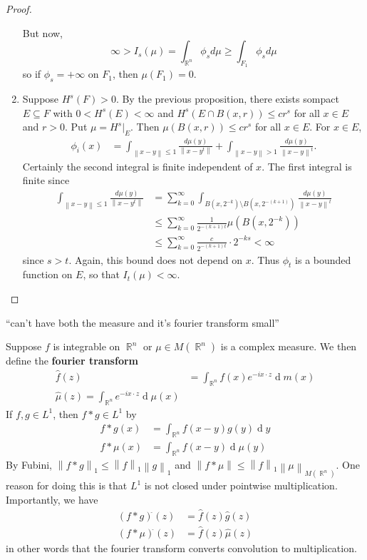 \documentclass[11pt, a4paper]{memoir}
\DeclareMathOperator{\R}{{\mathbb{R}}}
\newcommand{\norm}[1]{\ensuremath{\left\lVert#1\right\rVert}}
\theoremstyle{change}
\theoremstyle{plain}
\theoremstyle{nonumberplain}
\newtheorem{proof}{Proof}
\renewcommand{\d}[1]{\ensuremath{\operatorname{d}\!{#1}}}
\newcommand{\defn}[1]{{\boldmath\bfseries #1}}
\numberwithin{equation}{section}
\begin{document}
\begin{proof}
\begin{enumerate}[nl,r]
            But now,
            \begin{equation*}
                \infty>I_s(\mu)=\int_{\R^n}\phi_sd\mu\geq\int_{F_1}\phi_sd\mu
            \end{equation*}
            so if $\phi_s=+\infty$ on $F_1$, then $\mu(F_1)=0$.
        \item Suppose $H^s(F)>0$.
            By the previous proposition, there exists sompact $E\subseteq F$ with $0<H^s(E)<\infty$ and $H^s(E\cap B(x,r))\leq cr^s$ for all $x\in E$ and $r>0$.
            Put $\mu=H^s|_E$.
            Then $\mu(B(x,r))\leq cr^s$ for all $x\in E$.
            For $x\in E$,
            \begin{align*}
                \phi_i(x) &= \int_{\norm{x-y}\leq 1}\frac{d\mu(y)}{\norm{x-y^t}}+\int_{\norm{x-y}>1}\frac{d\mu(y)}{\norm{x-y}^t}.
            \end{align*}
            Certainly the second integral is finite independent of $x$.
            The first integral is finite since
            \begin{align*}
                \int_{\norm{x-y}\leq 1}\frac{d\mu(y)}{\norm{x-y^t}} &= \sum_{k=0}^\infty\int_{B(x,2^{-k})\setminus B(x,2^{-(k+1)})}\frac{d\mu(y)}{\norm{x-y}^t}\\
                                                                   &\leq\sum_{k=0}^\infty\frac{1}{2^{-(k+1)t}}\mu(B(x,2^{-k}))\\
                                                                   &\leq \sum_{k=0}^\infty\frac{c}{2^{-(k+1)t}}\cdot 2^{-ks}<\infty
            \end{align*}
            since $s>t$.
            Again, this bound does not depend on $x$.
            Thus $\phi_t$ is a bounded function on $E$, so that $I_t(\mu)<\infty$.
    \end{enumerate}
\end{proof}
``can't have both the measure and it's fourier transform small''

Suppose $f$ is integrable on $\R^n$ or $\mu\in M(\R^n)$ is a complex measure.
We then define the \defn{fourier transform}
\begin{align*}
    \hat{f}(z) &= \int_{\R^n}f(x)e^{-ix\cdot z}\d{m(x)}\\
    \hat{\mu}(z)=\int_{\R^n}e^{-ix\cdot z}\d{\mu(x)}
\end{align*}
If $f,g\in L^1$, then $f*g\in L^1$ by
\begin{align*}
    f*g(x) &= \int_{\R^n}f(x-y)g(y)\d{y}\\
    f*\mu(x) &= \int_{\R^n}f(x-y)\d{\mu(y)}
\end{align*}
By Fubini, $\norm{f*g}_1\leq\norm{f}_1\norm{g}_1$ and $\norm{f*\mu}\leq\norm{f}_1\norm{\mu}_{M(\R^n)}$.
One reason for doing this is that $L^1$ is not closed under pointwise multiplication.
Importantly, we have
\begin{align*}
    (f*g)^{\hat{}}(z)&=\hat{f}(z)\hat{g}(z)\\
    (f*\mu)^{\hat{}}(z) &= \hat{f}(z)\hat{\mu}(z)
\end{align*}
in other words that the fourier transform converts convolution to multiplication.
\end{document}
